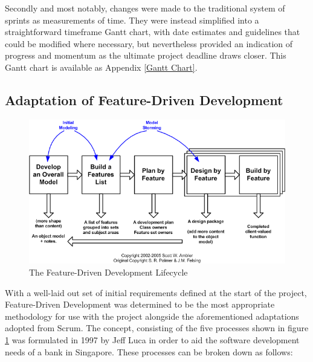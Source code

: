 Secondly and most notably, changes were made to the traditional system of sprints as measurements of time. They were instead simplified into a straightforward timeframe Gantt chart, with date estimates and guidelines that could be modified where necessary, but nevertheless provided an indication of progress and momentum as the ultimate project deadline draws closer. This Gantt chart is available as Appendix \ref{Gantt Chart}.

\subsection{Adaptation of Feature-Driven Development}

\begin{figure}
    \includegraphics[width=\textwidth]{Figures/fdd}
    \caption{The Feature-Driven Development Lifecycle}
    \label{fig:fdd1}
\end{figure}

With a well-laid out set of initial requirements defined at the start of the project, Feature-Driven Development was determined to be the most appropriate methodology for use with the project alongside the aforementioned adaptations adopted from Scrum. The concept, consisting of the five processes shown in figure \ref{fig:fdd1} was formulated in 1997 by Jeff Luca in order to aid the software development needs of a bank in Singapore. \cite{Arrk1} These processes can be broken down as follows:

